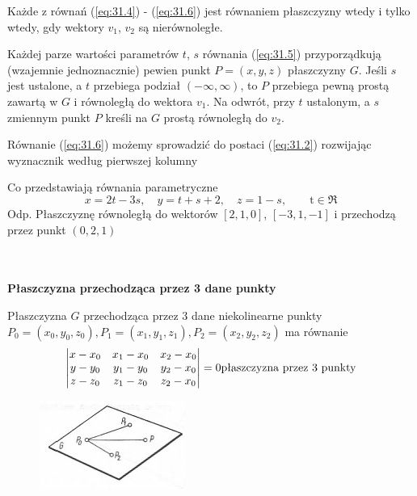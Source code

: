 \begin{uwaga}{1}
Każde z równań (\ref{eq:31.4}) - (\ref{eq:31.6}) jest równaniem płaszczyzny wtedy i tylko wtedy, gdy wektory $v_1$, $v_2$ są nierównoległe.
\end{uwaga}

\begin{uwaga}{2}
Każdej parze wartości parametrów $t$, $s$ równania (\ref{eq:31.5}) przyporządkują (wzajemnie jednoznacznie) pewien punkt $P= (x,y,z)$ płaszczyzny $G$. Jeśli $s$ jest ustalone, a $t$ przebiega podział $(-\infty, \infty)$, to  $P$ przebiega pewną prostą zawartą w $G$ i równoległą do wektora $v_1$. Na odwrót, przy $t$ ustalonym, a $s$ zmiennym punkt $P$ kreśli na $G$ prostą równoległą do $v_2$.
\end{uwaga}

\begin{uwaga}{3}
Równanie (\ref{eq:31.6}) możemy sprowadzić do postaci (\ref{eq:31.2}) rozwijając wyznacznik według pierwszej kolumny
\end{uwaga}

\begin{przyklad}{31.3}
Co przedstawiają równania parametryczne
\begin{equation}
	x=2t-3s, \quad y=t+s+2, \quad z=1-s, \qquad \textrm{t} \in \Re
	\label{eq:31.5}
\end{equation}
Odp. Płaszczyznę równoległą do wektorów $[2, 1, 0]$, $[-3, 1, -1]$ i przechodzą przez punkt $(0, 2, 1)$
\end{przyklad}
\\ \\
\textbf{Płaszczyzna przechodząca przez 3 dane punkty}
\begin{pkt}{31.3}
Płaszczyzna $G$ przechodząca przez 3 dane niekolinearne punkty $P_0=(x_0, y_0, z_0), P_1= (x_1, y_1, z_1), P_2=(x_2, y_2, z_2)$ ma równanie
\begin{equation}
	\begin{vmatrix}
		x - x_0 & x_1-x_0 & x_2-x_0\\
		y - y_0 & y_1-y_0 & y_2-x_0\\
		z - z_0 & z_1-z_0 & z_2-x_0\\
	\end{vmatrix}
	= 0 \hfill	\textrm{płaszczyzna przez 3 punkty}
	\label{eq:31.7}
\end{equation}
\begin{figure}[ht]
	\centering
		\includegraphics{rys/31_3.png}
	\caption{ }
	\label{fig:31.3}
\end{figure}
\end{pkt}

